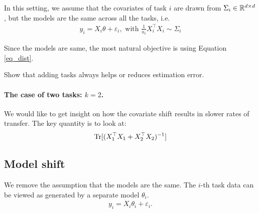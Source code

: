 In this setting, we assume that the covariates of task $i$ are drawn from $\Sigma_i \in \mathbb{R}^{d \times d}$, but the models are the same across all the tasks, i.e.
\begin{align}
  y_i = X_i \theta + \varepsilon_i, \mbox{ with } \frac 1 {n_i} X_i^{\top}X_i \sim \Sigma_i
\end{align}

Since the models are same, the most natural objective is using Equation \eqref{eq_dist}.

\begin{proposition}
  Show that adding tasks always helps or reduces estimation error.
\end{proposition}

\paragraph{The case of two tasks: $k = 2$.} We would like to get insight on how the covariate shift results in slower rates of transfer. The key quantity is to look at:
\begin{align}
  \operatorname{Tr}[(X_1^{\top}X_1 + X_2^{\top} X_2)^{-1}]
\end{align}

\subsection{Model shift}

We remove the assumption that the models are the same. The $i$-th task data can be viewed as generated by a separate model $\theta_i$. 
\begin{align}
  y_i = X_i \theta_i + \varepsilon_i.
\end{align}


